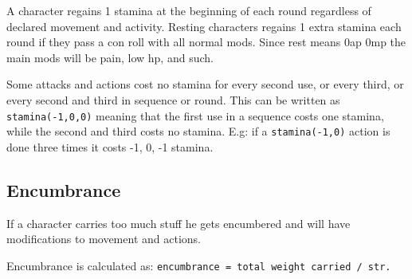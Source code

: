 A character regains 1 stamina at the beginning of each round regardless of declared movement and activity. Resting characters regains 1 extra stamina each round if they pass a con roll with all normal mods. Since rest means 0ap 0mp the main mods will be pain, low hp, and such.

Some attacks and actions cost no stamina for every second use, or every third, or every second and third in sequence or round. This can be written as \verb|stamina(-1,0,0)| meaning that the first use in a sequence costs one stamina, while the second and third costs no stamina. E.g: if a \verb|stamina(-1,0)| action is done three times it costs -1, 0, -1 stamina.



















\subsection*{Encumbrance}
If a character carries too much stuff he gets encumbered and will have modifications to movement and actions.

\noindent
Encumbrance is calculated as: \verb|encumbrance = total weight carried / str.|

